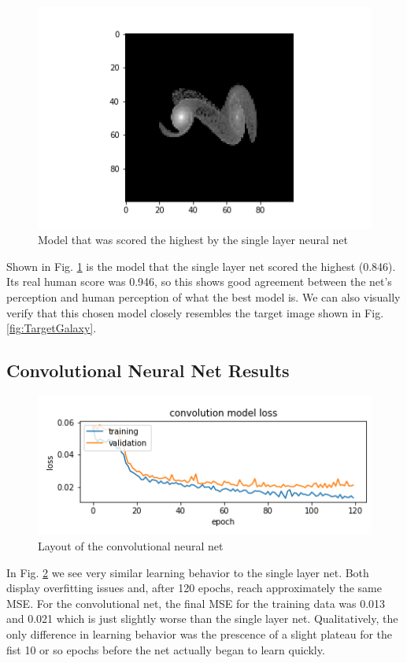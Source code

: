 \documentclass[conference]{IEEEtran}
\begin{document}
\begin{figure}[htbp]
\centerline{\includegraphics[width=0.75\linewidth]{./Images/SinglePredictedBest.png}}
\caption{Model that was scored the highest by the single layer neural net}
\label{fig:SinglePredictedBest}
\end{figure}

Shown in Fig. \ref{fig:SinglePredictedBest} is the model that the single layer net scored the highest (0.846). Its real human score was 0.946, so this shows good agreement between the net's perception and human perception of what the best model is. We can also visually verify that this chosen model closely resembles the target image shown in Fig. \ref{fig:TargetGalaxy}.

\subsection{Convolutional Neural Net Results}

\begin{figure}[htbp]
\centerline{\includegraphics[width=0.75\linewidth]{./Images/ConvModelLoss.png}}
\caption{Layout of the convolutional neural net}
\label{fig:ConvModelLoss}
\end{figure}

In Fig. \ref{fig:ConvModelLoss} we see very similar learning behavior to the single layer net. Both display overfitting issues and, after 120 epochs, reach approximately the same MSE. For the convolutional net, the final MSE for the training data was 0.013 and 0.021 which is just slightly worse than the single layer net. Qualitatively, the only difference in learning behavior was the prescence of a slight plateau for the fist 10 or so epochs before the net actually began to learn quickly.
\end{document}
